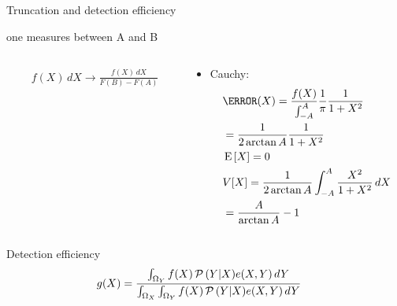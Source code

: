 \documentclass[asd-beamer.tex]{subfiles}%
\begin{document}
\begin{frame}{Truncation and detection efficiency}
    \begin{block}{one measures between A and B}
         \begin{columns}[T]
        \begin{column}{0.5\textwidth}
            \begin{align*}
                &f(X)\,dX\to\frac{f(X)\,dX}{F(B)-F(A)}
            \end{align*}
        \end{column}
        \begin{column}{0.5\textwidth}
            \begin{itemize}
            \item Cauchy:
            \begin{align*}
             &\g(X)=\frac{f(X)}{\int_{-A}^A}\frac{1}{\pi}\frac{1}{1+X^2}\\
             &=\frac{1}{2\arctan{A}}\frac{1}{1+X^2}\\
             &\E{[X]}=0\\
             &V{[X]}=\frac{1}{2\arctan{A}}\int_{-A}^A \frac{X^2}{1+X^2}\,dX\\
             &=\frac{A}{\arctan{A}}-1
            \end{align*}
            \end{itemize}
        \end{column}
    \end{columns}
    \end{block}
    \begin{block}{Detection efficiency}
        \begin{align*}
            &g(X)=\frac{\int_{\Omega_Y}f(X)\operatorname{\mathcal{P}}{(Y|X)}e(X,Y)\,dY}{\int_{\Omega_X}\int_{\Omega_Y}f(X)\operatorname{\mathcal{P}}{(Y|X)}e(X,Y)\,dY}   
        \end{align*}
    \end{block}
\end{frame}
\end{document}
